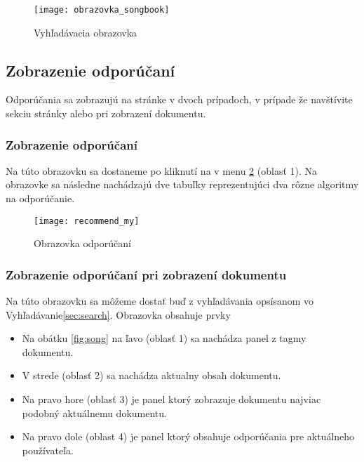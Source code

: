 \begin{figure}
    \begin{center}
        \texttt{[image: obrazovka\_songbook]}
        \caption{Vyhľadávacia obrazovka}
        \label{fig:songbook}
    \end{center}
\end{figure}

\subsection{Zobrazenie odporúčaní}

Odporúčania sa zobrazujú na stránke v dvoch prípadoch, v prípade že navštívite 
sekciu stránky  alebo pri zobrazení dokumentu.

\subsubsection{Zobrazenie odporúčaní }

Na túto obrazovku sa dostaneme po kliknutí na  v menu \ref{fig:recommendmy}
(oblasť 1). Na obrazovke sa následne nachádzajú dve tabuľky reprezentujúci dva rôzne algoritmy
na odporúčanie.

\begin{figure}
    \begin{center}
        \texttt{[image: recommend\_my]}
        \caption{Obrazovka odporúčaní}
        \label{fig:recommendmy}
    \end{center}
\end{figure}

\subsubsection{Zobrazenie odporúčaní pri zobrazení dokumentu}

Na túto obrazovku sa môžeme dostať buď z vyhľadávania opsísanom vo Vyhľadávanie\ref{sec:search}.
Obrazovka obsahuje prvky

\begin{itemize}
\item{Na obátku \ref{fig:song} na ľavo (oblasť 1) sa nachádza panel z tagmy dokumentu.}
\item{V strede (oblasť 2) sa nachádza aktualny obsah dokumentu.}
\item{Na pravo hore (oblasť 3) je panel ktorý zobrazuje dokumentu najviac podobný
    aktuálnemu dokumentu.}
\item{Na pravo dole (oblast 4) je panel ktorý obsahuje odporúčania pre aktuálneho používateľa.}
\end{itemize}


